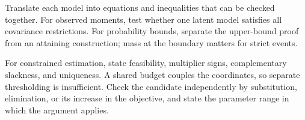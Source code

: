 Translate each model into equations and inequalities that can be checked together. For observed moments, test whether one latent model satisfies all covariance restrictions. For probability bounds, separate the upper-bound proof from an attaining construction; mass at the boundary matters for strict events.

For constrained estimation, state feasibility, multiplier signs, complementary slackness, and uniqueness. A shared budget couples the coordinates, so separate thresholding is insufficient. Check the candidate independently by substitution, elimination, or its increase in the objective, and state the parameter range in which the argument applies.
\par\smallskip
